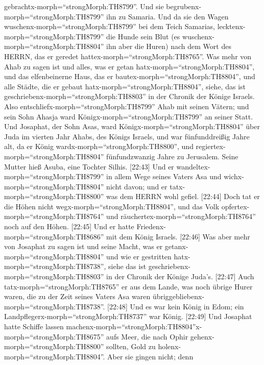 gebrachtx-morph=``strongMorph:TH8799''. Und sie
begrubenx-morph=``strongMorph:TH8799'' ihn zu Samaria.  Und
da sie den Wagen wuschenx-morph=``strongMorph:TH8799'' bei dem Teich
Samarias, lecktenx-morph=``strongMorph:TH8799'' die Hunde sein Blut (es
wuschenx-morph=``strongMorph:TH8804'' ihn aber die Huren) nach dem Wort
des HERRN, das er geredet hattex-morph=``strongMorph:TH8765''.
 Was mehr von Ahab zu sagen ist und alles, was er getan
hatx-morph=``strongMorph:TH8804'', und das elfenbeinerne Haus, das er
bautex-morph=``strongMorph:TH8804'', und alle Städte, die er gebaut
hatx-morph=``strongMorph:TH8804'', siehe, das ist
geschriebenx-morph=``strongMorph:TH8803'' in der Chronik der Könige
Israels.  Also entschliefx-morph=``strongMorph:TH8799''
Ahab mit seinen Vätern; und sein Sohn Ahasja ward
Königx-morph=``strongMorph:TH8799'' an seiner Statt.  Und
Josaphat, der Sohn Asas, ward Königx-morph=``strongMorph:TH8804'' über
Juda im vierten Jahr Ahabs, des Königs Israels,  und war
fünfunddreißig Jahre alt, da er König
wardx-morph=``strongMorph:TH8800'', und
regiertex-morph=``strongMorph:TH8804'' fünfundzwanzig Jahre zu
Jerusalem. Seine Mutter hieß Asuba, eine Tochter Silhis. {[}22:43{]} Und
er wandeltex-morph=``strongMorph:TH8799'' in allem Wege seines Vaters
Asa und wichx-morph=``strongMorph:TH8804'' nicht davon; und er
tatx-morph=``strongMorph:TH8800'' was dem HERRN wohl gefiel.
 {[}22:44{]} Doch tat er die Höhen nicht
wegx-morph=``strongMorph:TH8804'', und das Volk
opfertex-morph=``strongMorph:TH8764'' und
räuchertex-morph=``strongMorph:TH8764'' noch auf den Höhen.
 {[}22:45{]} Und er hatte
Friedenx-morph=``strongMorph:TH8686'' mit dem König Israels.
 {[}22:46{]} Was aber mehr von Josaphat zu sagen ist und
seine Macht, was er getanx-morph=``strongMorph:TH8804'' und wie er
gestritten hatx-morph=``strongMorph:TH8738'', siehe das ist
geschriebenx-morph=``strongMorph:TH8803'' in der Chronik der Könige
Juda's.  {[}22:47{]} Auch tatx-morph=``strongMorph:TH8765''
er aus dem Lande, was noch übrige Hurer waren, die zu der Zeit seines
Vaters Asa waren übriggebliebenx-morph=``strongMorph:TH8738''.
 {[}22:48{]} Und es war kein König in Edom; ein
Landpflegerx-morph=``strongMorph:TH8737'' war König. 
{[}22:49{]} Und Josaphat hatte Schiffe lassen
machenx-morph=``strongMorph:TH8804''\textbar x-morph=``strongMorph:TH8675''
aufs Meer, die nach Ophir gehenx-morph=``strongMorph:TH8800'' sollten,
Gold zu holenx-morph=``strongMorph:TH8804''. Aber sie gingen nicht; denn
